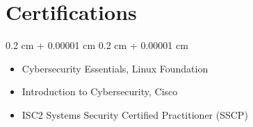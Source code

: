 \documentclass[10pt, letterpaper]{article}
\newenvironment{highlights}{
    \begin{itemize}[
        topsep=0.10 cm,
        parsep=0.10 cm,
        partopsep=0pt,
        itemsep=0pt,
        leftmargin=0.4 cm + 10pt
    ]
}{
    \end{itemize}
} %
\newenvironment{onecolentry}{
    \begin{adjustwidth}{
        0.2 cm + 0.00001 cm
    }{
        0.2 cm + 0.00001 cm
    }
}{
    \end{adjustwidth}
} %
\begin{document}
    \section{Certifications}
    \begin{onecolentry}
        \begin{highlights}
            \item Cybersecurity Essentials, Linux Foundation
            \item Introduction to Cybersecurity, Cisco
            \item ISC2 Systems Security Certified Practitioner (SSCP)
        \end{highlights}
    \end{onecolentry}
\end{document}
